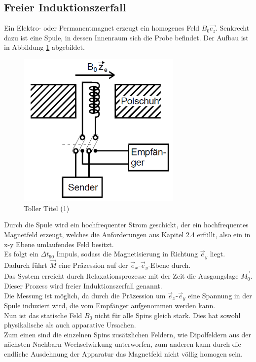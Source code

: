 \documentclass[]{scrartcl}
\begin{document}
\subsection{Freier Induktionszerfall}
Ein Elektro- oder Permanentmagnet erzeugt ein homogenes Feld $B_0\vec{e_z}$. 
Senkrecht dazu ist eine Spule, in dessen Innenraum sich die Probe befindet. Der Aufbau ist in Abbildung \ref{fig::aufbau} abgebildet.
\begin{figure}[H]
\centering
\includegraphics[width=8cm]{images/versuchsaufbau.png}
\caption{Toller Titel (1)}
\label{fig::aufbau}
\end{figure}
Durch die Spule wird ein hochfrequenter Strom geschickt, der ein hochfrequentes Magnetfeld erzeugt, welches die Anforderungen aus Kapitel 2.4 erfüllt, also ein in x-y Ebene umlaufendes Feld besitzt.\\
Es folgt ein $\Delta t_{90}$ Impuls, sodass die Magnetisierung in Richtung $\vec{e}_y$ liegt. Dadurch führt $\vec{M}$ eine Präzession auf der $\vec{e}_x$-$\vec{e}_y$-Ebene durch.\\
Das System erreicht durch Relaxationsprozesse mit der Zeit die Ausgangslage $\vec{M_0}$.\\
Dieser Prozess wird freier Induktionszerfall genannt.\\
Die Messung ist möglich, da durch die Präzession um $\vec{e}_x$-$\vec{e}_y$ eine Spannung in der Spule induziert wird, die vom Empfänger aufgenommen werden kann.\\
Nun ist das statische Feld $B_0$ nicht für alle Spins gleich stark. Dies hat sowohl physikalische als auch apparative Ursachen.\\
Zum einen sind die einzelnen Spins zusätzlichen Feldern, wie Dipolfeldern aus der nächsten Nachbarn-Wechselwirkung unterworfen, zum anderen kann durch die endliche Ausdehnung der Apparatur das Magnetfeld nicht völlig homogen sein.\\
\end{document}
